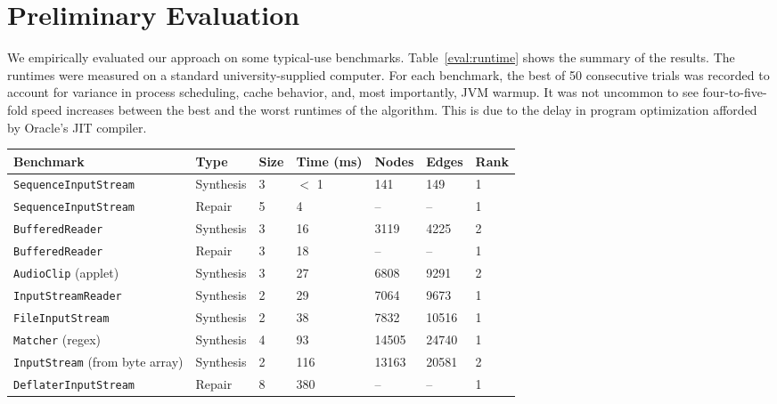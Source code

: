 \section{Preliminary Evaluation}
\label{sec:evaluation}

We empirically evaluated our approach on some typical-use benchmarks. Table~\ref{eval:runtime} shows the summary of the results. The runtimes were measured on a standard university-supplied computer. For each benchmark, the best of 50 consecutive trials was recorded to account for variance in process scheduling, cache behavior, and, most importantly, JVM warmup. It was not uncommon to see four-to-five-fold speed increases between the best and the worst runtimes of the algorithm. This is due to the delay in program optimization afforded by Oracle's JIT compiler.

\begin{table*}[hbt]
  \centering
  \begin{tabularx}{\linewidth}{| l | X | X | X | X | X | X |}
    \hline
    \textbf{Benchmark} & \textbf{Type} & \textbf{Size} & \textbf{Time (ms)} & \textbf{Nodes} & \textbf{Edges} & \textbf{Rank} \\ \hline
	\texttt{SequenceInputStream} & Synthesis & 3 & $<$ 1 & 141   & 149   & 1 \\ \hline
	\texttt{SequenceInputStream} & Repair    & 5 & 4   & --    & --    & 1 \\ \hline
    \texttt{BufferedReader}      & Synthesis & 3 & 16  & 3119  & 4225  & 2 \\ \hline
    \texttt{BufferedReader}      & Repair    & 3 & 18  & --    & --    & 1 \\ \hline
    \texttt{AudioClip} (applet)  & Synthesis & 3 & 27  & 6808  & 9291  & 2 \\ \hline
    \texttt{InputStreamReader}   & Synthesis & 2 & 29  & 7064  & 9673  & 1 \\ \hline
    \texttt{FileInputStream}     & Synthesis & 2 & 38  & 7832  & 10516 & 1 \\ \hline
    \texttt{Matcher} (regex)     & Synthesis & 4 & 93  & 14505 & 24740 & 1 \\ \hline
    \texttt{InputStream} (from byte array) & Synthesis & 2 & 116 & 13163  & 20581  & 2 \\ \hline
    \texttt{DeflaterInputStream} & Repair & 8    & 380 & -- & -- & 1 \\ \hline
  \end{tabularx}
  \caption{Typical-use runtimes in various benchmarks. ``Nodes'' and ``Edges'' refer to the size of the searched subgraph, and ``Rank'' indicates the correct expression's position among the results. The ``size'' refers to the number of subexpressions in the output expression. The entire Java standard library was used to build the graph before running the benchmarks. Each test case was initialized with a small environment consisting of five variables, and produced ten results.}
  \label{eval:runtime}
\end{table*}

